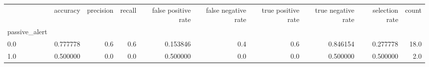 \begin{tabular}{lrrrrrrrrr}
\toprule
{} &  accuracy &  precision &  recall &  false positive rate &  false negative rate &  true positive rate &  true negative rate &  selection rate &  count \\
passive\_alert &           &            &         &                      &                      &                     &                     &                 &        \\
\midrule
0.0           &  0.777778 &        0.6 &     0.6 &             0.153846 &                  0.4 &                 0.6 &            0.846154 &        0.277778 &   18.0 \\
1.0           &  0.500000 &        0.0 &     0.0 &             0.500000 &                  0.0 &                 0.0 &            0.500000 &        0.500000 &    2.0 \\
\bottomrule
\end{tabular}
